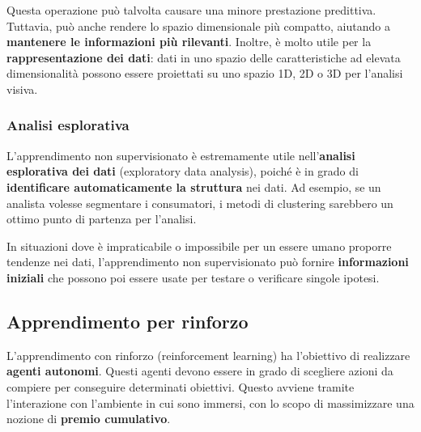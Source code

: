 Questa operazione può talvolta causare una minore prestazione
predittiva. Tuttavia, può anche rendere lo spazio
dimensionale più compatto, aiutando a \textbf{mantenere le
informazioni più rilevanti}.
Inoltre, è molto utile per la \textbf{rappresentazione dei dati}:
dati in uno spazio delle caratteristiche ad elevata dimensionalità
possono essere proiettati su uno spazio 1D, 2D o 3D per
l'analisi visiva.

\subsubsection{Analisi esplorativa}

L'apprendimento non supervisionato è estremamente utile
nell'\textbf{analisi esplorativa dei dati} (exploratory data
analysis), poiché è in grado di \textbf{identificare
automaticamente la struttura} nei dati.
Ad esempio, se un analista volesse segmentare i consumatori,
i metodi di clustering sarebbero un ottimo punto di partenza
per l'analisi.

In situazioni dove è impraticabile o impossibile per un essere
umano proporre tendenze nei dati, l'apprendimento non
supervisionato può fornire \textbf{informazioni iniziali} che
possono poi essere usate per testare o verificare singole
ipotesi.

\subsection{Apprendimento per rinforzo}

L'apprendimento con rinforzo (reinforcement learning) ha l'obiettivo di
realizzare \textbf{agenti autonomi}. Questi agenti devono
essere in grado di scegliere azioni da compiere per conseguire
determinati obiettivi. Questo avviene tramite
l'interazione con l'ambiente in cui sono immersi, con lo scopo
di massimizzare una nozione di \textbf{premio cumulativo}.
